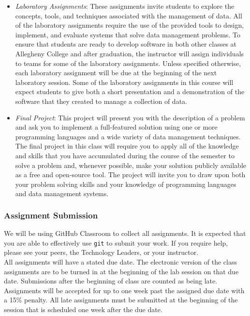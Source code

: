 \documentclass[11pt]{article} %
\begin{document}
\begin{itemize}
  \item {\em Laboratory Assignments}: These assignments invite students to explore the concepts, tools, and techniques associated with the management of data.  All of the laboratory assignments require the use of the provided tools to design, implement, and evaluate systems that solve data management problems.  To ensure that students are ready to develop software in both other classes at Allegheny College and after graduation, the instructor will assign individuals to teams for some of the laboratory assignments.  Unless specified otherwise, each laboratory assignment will be due at the beginning of the next laboratory session.  Some of the laboratory assignments in this course will expect students to give both a short presentation and a demonstration of the software that they created to manage a collection of data.  


  \item {\em Final Project}: This project will present you with the description of a problem and ask you to implement a full-featured solution using one or more programming languages and a wide variety of data management techniques. The final project in this class will require you to apply all of the knowledge and skills that you have accumulated during the course of the semester to solve a problem and, whenever possible, make your solution publicly available as a free and open-source tool. The project will invite you to draw upon both your problem solving skills and your knowledge of programming languages and data management systems. 


\end{itemize}

\subsubsection*{Assignment Submission}

We will be using GitHub Classroom to collect all assignments. It is expected that you are able to effectively use {\tt git} to submit your work. If you require help, please see your peers, the Technology Leaders, or your instructor.\\

All assignments will have a stated due date. \color{red} The electronic version of the class assignments are to be turned in at the beginning of the lab session on that due date. Submissions after the beginning of class are counted as being late.  Assignments will be accepted for up to one week past the assigned due date with a 15\% penalty. \color{black} All late assignments must be submitted at the beginning of the session that is scheduled one week after the due date. 
\end{document}

